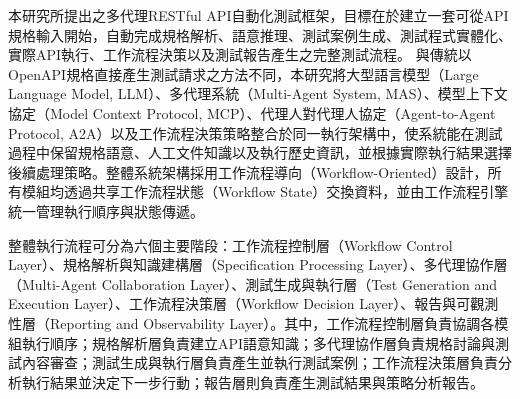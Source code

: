 \begin{ZhChapter}
\text 本研究所提出之多代理RESTful API自動化測試框架，目標在於建立一套可從API規格輸入開始，自動完成規格解析、語意推理、測試案例生成、測試程式實體化、實際API執行、工作流程決策以及測試報告產生之完整測試流程。
\text 與傳統以OpenAPI規格直接產生測試請求之方法不同，本研究將大型語言模型（Large Language Model, LLM）、多代理系統（Multi-Agent System, MAS）、模型上下文協定（Model Context Protocol, MCP）、代理人對代理人協定（Agent-to-Agent Protocol, A2A）以及工作流程決策策略整合於同一執行架構中，使系統能在測試過程中保留規格語意、人工文件知識以及執行歷史資訊，並根據實際執行結果選擇後續處理策略。整體系統架構採用工作流程導向（Workflow-Oriented）設計，所有模組均透過共享工作流程狀態（Workflow State）交換資料，並由工作流程引擎統一管理執行順序與狀態傳遞。



\text 整體執行流程可分為六個主要階段：工作流程控制層（Workflow Control Layer）、規格解析與知識建構層（Specification Processing Layer）、多代理協作層（Multi-Agent Collaboration Layer）、測試生成與執行層（Test Generation and Execution Layer）、工作流程決策層（Workflow Decision Layer）、報告與可觀測性層（Reporting and Observability Layer）。其中，工作流程控制層負責協調各模組執行順序；規格解析層負責建立API語意知識；多代理協作層負責規格討論與測試內容審查；測試生成與執行層負責產生並執行測試案例；工作流程決策層負責分析執行結果並決定下一步行動；報告層則負責產生測試結果與策略分析報告。


\end{ZhChapter}
